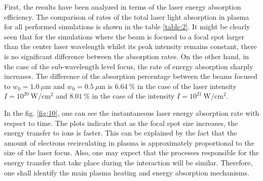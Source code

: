 First, the results have been analyzed in terms of the laser energy absorption efficiency. The comparison of rates of the total laser light absorption in plasma for all performed simulations is shown in the table \ref{table:2}. It might be clearly seen that for the simulations where the beam is focused to a focal spot larger than the center laser wavelength whilst its peak intensity remains constant, there is no significant difference between the absorption rates. On the other hand, in the case of the sub-wavelength level focus, the rate of energy absorption sharply increases. The difference of the absorption percentage between the beams focused to $ w_0 = 1.0 \ \mu\mathrm{m} $ and $ w_0 = 0.5 \ \mu\mathrm{m} $ is $ 6.64 \ \% $ in the case of the laser intensity $ I = 10^{20} \ \mathrm{W/cm^2} $ and $ 8.01 \ \% $ in the case of the intensity $ I = 10^{21} \ \mathrm{W/cm^2} $.

In the fig. \ref{fig:10}, one can see the instantaneous laser energy absorption rate with respect to time. The plots indicate that as the focal spot size increases, the energy transfer to ions is faster. This can be explained by the fact that the amount of electrons recirculating in plasma is approximately proportional to the size of the laser focus. Also, one may expect that the processes responsible for the energy transfer that take place during the interaction will be similar. Therefore, one shall identify the main plasma heating and energy absorption mechanisms.

